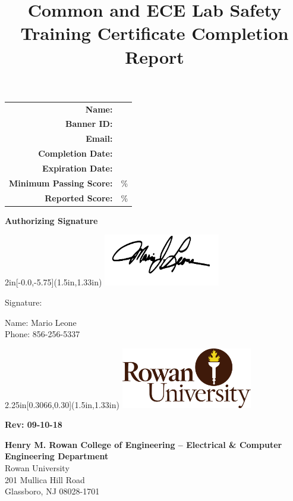 \documentclass{article}
\title{\textbf{Common and ECE Lab Safety Training Certificate Completion
    Report}\vspace{-9ex}}
\author{}
\date{}
\def \name {}
\def \banner {}
\def \email {}
\def \completionDate {}
\def \expirationDate {}
\def \minScore {}
\def \score {}
\begin{document}
\maketitle

{\renewcommand{\arraystretch}{2}
  \begin{tabular}{r l}
  \textbf{Name:                 } & \name\\
  \textbf{Banner ID:            } & \banner\\
  \textbf{Email:                } & \email\\
  \textbf{Completion Date:      } & \completionDate\\
  \textbf{Expiration Date:      } & \expirationDate\\
  \textbf{Minimum Passing Score:} & \minScore\%\\
  \textbf{Reported Score:       } & \score\%\\

\end{tabular}
}

\vspace{3\baselineskip}

\begin{Large}
\textbf{Authorizing Signature}
\end{Large}


\begin{textblock*}{2in}[-0.0,-5.75](1.5in,1.33in)
  \includegraphics[width=2in]{./signature.pdf}
\end{textblock*}

\vspace{5\baselineskip}
Signature:\\
\bigskip

Name: Mario Leone\\
Phone: 856-256-5337


\begin{textblock*}{2.25in}[0.3066,0.30](1.5in,1.33in)
  \includegraphics[width=2.25in]{./rowan_logo.png}
\end{textblock*}

\vfill
{\normalsize\sffamily
  \begin{flushright}
    \textbf{Rev: 09-10-18\\[-0.1\baselineskip]}
  \end{flushright}
  \textbf{Henry M. Rowan College of Engineering – Electrical \& Computer Engineering Department}\\
  Rowan University\\
  201 Mullica Hill Road\\
  Glassboro, NJ 08028-1701
}
\end{document}
